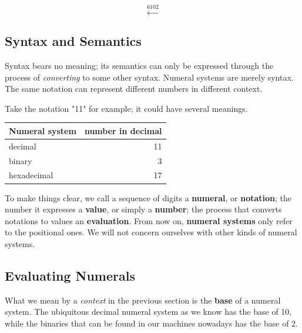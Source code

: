 \documentclass[\main/thesis.tex]{subfiles}
\begin{document}
$$ \xleftarrow{6102} $$

\subsection{Syntax and Semantics}

Syntax bears no meaning;
its semantics can only be expressed through the process of \textit{converting} to some other syntax.
Numeral systems are merely syntax.
The same notation can represent different numbers in different context.

Take the notation "11" for example; it could have several meanings.

\begin{center}
    \begin{tabular}{ | l | r | }
    \textbf{Numeral system}      & \textbf{number in decimal}  \\
    \hline
    decimal             & 11    \\
    binary              & 3     \\
    hexadecimal         & 17    \\
    \end{tabular}
\end{center}

To make things clear, we call a sequence of digits a \textbf{numeral}, or \textbf{notation};
the number it expresses a \textbf{value}, or simply a \textbf{number};
the process that converts notations to values an \textbf{evaluation}.
From now on, \textbf{numeral systems} only refer to the positional ones.
We will not concern ourselves with other kinds of numeral systems.

\subsection{Evaluating Numerals}

What we mean by a \textit{context} in the previous section is the \textbf{base}
of a numeral system.
The ubiquitous decimal numeral system as we know has the base of 10,
while the binaries that can be found in our machines nowadays has the base of 2.
\end{document}
